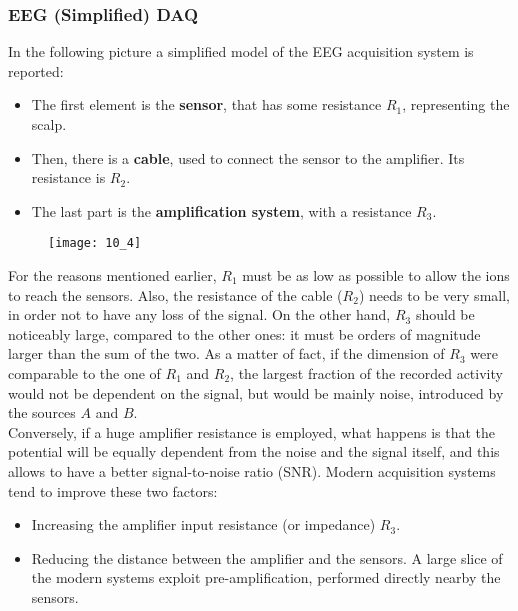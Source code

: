 \subsubsection{EEG (Simplified) DAQ}
In the following picture a simplified model of the EEG acquisition system is reported:
\begin{itemize}
    \item The first element is the \textbf{sensor}, that has some resistance
          \(R_1\), representing the scalp.
    \item Then, there is a \textbf{cable}, used to connect the sensor to the amplifier.
          Its resistance is \(R_2\).
    \item The last part is the \textbf{amplification system}, with a resistance \(R_3\).
\end{itemize}
\begin{figure}[H]
    \texttt{[image: 10\_4]}
    \centering
\end{figure}
For the reasons mentioned earlier, \(R_1\) must be as low as possible to allow the ions to
reach the sensors. Also, the resistance of the cable (\(R_2\)) needs to be very small, in
order not to have any loss of the signal. On the other hand, \(R_3\) should be noticeably
large, compared to the other ones: it must be orders of magnitude larger than the sum of
the two. As a matter of fact, if the dimension of \(R_3\) were comparable to the one of
\(R_1\) and \(R_2\), the largest fraction of the recorded activity would not be dependent on
the signal, but would be mainly noise, introduced by the sources \(A\) and \(B\).\\
Conversely, if a huge amplifier resistance is employed, what happens is that the potential
will be equally dependent from the noise and the signal itself, and this allows to have a
better signal-to-noise ratio (SNR). Modern acquisition systems tend to improve these two
factors:
\begin{itemize}
    \item Increasing the amplifier input resistance (or impedance) \(R_3\).
    \item Reducing the distance between the amplifier and the sensors. A large slice of the
    modern systems exploit pre-amplification, performed directly nearby the sensors.
\end{itemize}
